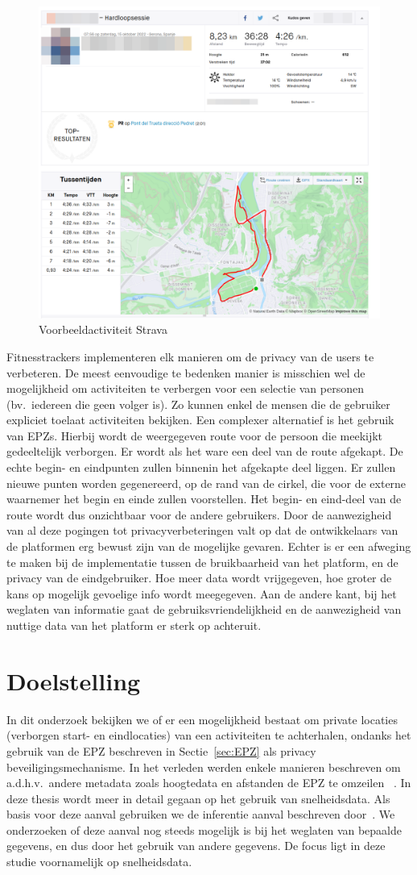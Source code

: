 \begin{figure}
    \centering
    \includegraphics[width=0.5\linewidth]{fig/VoorbeeldActiviteiten/VoorbeeldActiviteit_Cropped.png}
    \caption{Voorbeeldactiviteit Strava}\label{fig:activityExample}
\end{figure}

Fitnesstrackers implementeren elk manieren om de privacy van de users te
verbeteren. De meest eenvoudige te bedenken manier is misschien wel de
mogelijkheid om activiteiten te verbergen voor een selectie van personen (bv.\
iedereen die geen volger is). Zo kunnen enkel de mensen die de gebruiker
expliciet toelaat activiteiten bekijken. Een complexer alternatief is het
gebruik van \acp{EPZ}. Hierbij wordt de weergegeven route voor de persoon die
meekijkt gedeeltelijk verborgen. Er wordt als het ware een deel van de route
afgekapt. De echte begin- en eindpunten zullen binnenin het afgekapte deel
liggen. Er zullen nieuwe punten worden gegenereerd, op de rand van de cirkel,
die voor de externe waarnemer het begin en einde zullen voorstellen. Het begin-
en eind-deel van de route wordt dus onzichtbaar voor de andere gebruikers. Door
de aanwezigheid van al deze pogingen tot privacyverbeteringen valt op dat de
ontwikkelaars van de platformen erg bewust zijn van de mogelijke gevaren.
Echter is er een afweging te maken bij de implementatie tussen de bruikbaarheid
van het platform, en de privacy van de eindgebruiker. Hoe meer data wordt
vrijgegeven, hoe groter de kans op mogelijk gevoelige info wordt meegegeven.
Aan de andere kant, bij het weglaten van informatie gaat de
gebruiksvriendelijkheid en de aanwezigheid van nuttige data van het platform er
sterk op achteruit.

\section{Doelstelling}
In dit onderzoek bekijken we of er een mogelijkheid bestaat om private locaties
(verborgen start- en eindlocaties) van een activiteiten te achterhalen, ondanks
het gebruik van de \ac{EPZ} beschreven in Sectie~\ref{sec:EPZ} als privacy
beveiligingsmechanisme. In het verleden werden enkele manieren beschreven om
a.d.h.v.\ andere metadata zoals hoogtedata en afstanden de \ac{EPZ} te omzeilen
~\cite{Verdonck_2022, Dhondt, sec18has3}. In deze thesis wordt meer in detail
gegaan op het gebruik van snelheidsdata. Als basis voor deze aanval gebruiken
we de inferentie aanval beschreven door~\citeauthor{Dhondt}. We onderzoeken of
deze aanval nog steeds mogelijk is bij het weglaten van bepaalde gegevens, en
dus door het gebruik van andere gegevens. De focus ligt in deze studie
voornamelijk op snelheidsdata.


